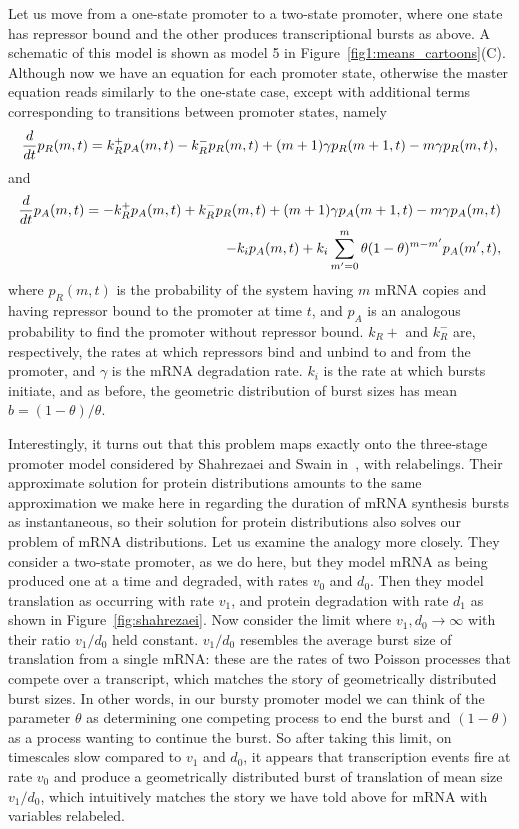Let us move from a one-state promoter to a two-state promoter, where one state
has repressor bound and the other produces transcriptional bursts as above.
A schematic of this model is shown as model 5 in
Figure~\ref{fig1:means_cartoons}(C). Although now we have an equation for each
promoter state, otherwise the master equation reads similarly to the one-state
case, except with additional terms corresponding to transitions between promoter
states, namely
\begin{equation}
{d\over dt}p_R(m,t) =
k_R^+ p_A(m,t) - k_R^- p_R(m,t)
        + (m+1)\gamma p_R(m+1,t) - m\gamma p_R(m,t),
\end{equation}
and
\begin{equation}
\begin{split}
{d\over dt}p_A(m,t) = - k_R^+ p_A(m,t) + k_R^- p_R(m,t)
        + (m+1)\gamma p_A(m+1,t) - m\gamma p_A(m,t) 
\\
- k_i p_A(m,t) + k_i \sum_{m^\prime=0}^m \theta(1-\theta)^{m-m^\prime} p_A(m^\prime,t),
\end{split}
\end{equation}
where $p_R(m,t)$ is the probability of the system having $m$ mRNA copies and
having repressor bound to the promoter at time $t$, and $p_A$ is an analogous
probability to find the promoter without repressor bound. $k_R+$ and $k_R^-$
are, respectively, the rates at which repressors bind and unbind to and from the
promoter, and $\gamma$ is the mRNA degradation rate. $k_i$ is the rate at which
bursts initiate, and as before, the geometric distribution of burst sizes has
mean $b=(1-\theta)/\theta$.

Interestingly, it turns out that this problem maps exactly onto the three-stage
promoter model considered by Shahrezaei and Swain in~\cite{Shahrezaei2008}, with
relabelings. Their approximate solution for protein distributions amounts to the
same approximation we make here in regarding the duration of mRNA synthesis
bursts as instantaneous, so their solution for protein distributions also solves
our problem of mRNA distributions. Let us examine the analogy more closely. They
consider a two-state promoter, as we do here, but they model mRNA as being
produced one at a time and degraded, with rates $v_0$ and $d_0$. Then they model
translation as occurring with rate $v_1$, and protein degradation with rate
$d_1$ as shown in Figure~\ref{fig:shahrezaei}. Now consider the limit where
$v_1, d_0\rightarrow\infty$ with their ratio $v_1/d_0$ held constant. $v_1/d_0$
resembles the average burst size of translation from a single mRNA: these are
the rates of two Poisson processes that compete over a transcript, which matches
the story of geometrically distributed burst sizes. In other words, in our 
bursty promoter model we can think of the parameter $\theta$ as determining one
competing process to end the burst and $(1 - \theta)$ as a process wanting to
continue the burst. So after taking this limit, on timescales slow compared to
$v_1$ and $d_0$, it appears that transcription events fire at rate $v_0$ and
produce a geometrically distributed burst of translation of mean size $v_1/d_0$,
which intuitively matches the story we have told above for mRNA with variables
relabeled.

